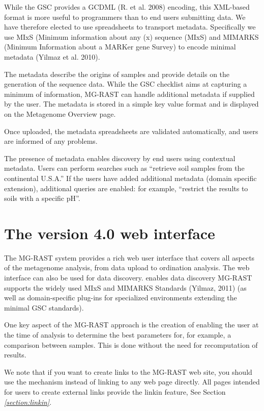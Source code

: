 \documentclass[letterpaper,10pt,english]{sphinxmanual}
\begin{document}
While the GSC provides a GCDML (R. et al. 2008) encoding, this XML-based
format is more useful to programmers than to end users submitting data.
We have therefore elected to use spreadsheets to transport metadata.
Specifically we use MIxS (Minimum information about any (x) sequence
(MIxS) and MIMARKS (Minimum Information about a MARKer gene Survey) to
encode minimal metadata (Yilmaz et al. 2010).

The metadata describe the origins of samples and provide details on the
generation of the sequence data. While the GSC checklist aims at
capturing a minimum of information, MG-RAST can handle additional
metadata if supplied by the user. The metadata is stored in a simple key
value format and is displayed on the Metagenome Overview page.

Once uploaded, the metadata spreadsheets are validated automatically,
and users are informed of any problems.

The presence of metadata enables discovery by end users using contextual
metadata. Users can perform searches such as “retrieve soil samples from
the continental U.S.A.” If the users have added additional metadata
(domain specific extension), additional queries are enabled: for
example, “restrict the results to soils with a specific pH”.


\chapter{The version 4.0 web interface}
\label{\detokenize{user_manual:the-version-4-0-web-interface}}
\begin{DUlineblock}{0em}
\item[] The MG-RAST system provides a rich web user interface that covers all
aspects of the metagenome analysis, from data upload to ordination
analysis. The web interface can also be used for data discovery.
 enables data discovery MG-RAST supports the widely used
MIxS and MIMARKS Standards (Yilmaz, 2011) (as well as domain-specific
plug-ins for specialized environments extending the minimal GSC
standards).
\item[] One key aspect of the MG-RAST approach is the creation of  enabling the user at the time of analysis to determine the
best parameters for, for example, a comparison between samples. This
is done without the need for recomputation of results.
\item[] We note that if you want to create links to the MG-RAST web site, you
should use the  mechanism instead of linking to any web page
directly. All pages intended for users to create external links
provide the linkin feature, See Section
{\hyperref[\detokenize{user_manual:section:linkin}]{\emph{{[}section:linkin{]}}}}.
\end{DUlineblock}
\end{document}
